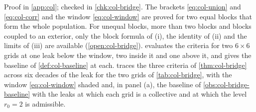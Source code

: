 Proof in \cref{app:col}; checked in \cref{chk:col-bridge}. The brackets \eqref{eq:col-union} and \eqref{eq:col-corr} and the window \eqref{eq:col-window} are proved for two equal blocks that form the whole population. For unequal blocks, more than two blocks and blocks coupled to an exterior, only the block formula of (i), the identity of (ii) and the limits of (iii) are available (\cref{open:col-bridge}).  evaluates the criteria for two $6\times6$ grids at one leak below the window, two inside it and one above it, and gives the baseline of \cref{def:col-baseline} at each.  traces the three criteria of \cref{thm:col-bridge} across six decades of the leak for the two grids of \cref{tab:col-bridge}, with the window \eqref{eq:col-window} shaded and, in panel (a), the baseline of \cref{obs:col-bridge-baseline} with the leaks at which each grid is a collective and at which the level $r_0=2$ is admissible.

